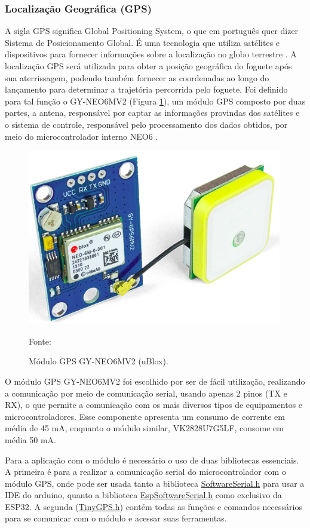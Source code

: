 \subsubsection{Localização Geográfica (GPS)}

A sigla GPS significa Global Positioning System, o que em português quer dizer Sistema de Posicionamento Global. É uma tecnologia que utiliza satélites e dispositivos para fornecer informações sobre a localização no globo terrestre \cite{fisica_GPS_2020}.
A localização GPS será utilizada para obter a posição geográfica do foguete após sua aterrissagem, podendo também fornecer as coordenadas ao longo do lançamento para determinar a trajetória percorrida pelo foguete.
Foi definido para tal função o GY-NEO6MV2 (Figura \ref{fig:moduloGPS}), um módulo GPS composto por duas partes, a antena, responsável por captar as informações provindas dos satélites e o sistema de controle, responsável pelo processamento dos dados obtidos, por meio do microcontrolador interno NEO6 \cite{datasheet_GPS}.

\begin{figure}[H]
  \centering
  \includegraphics[scale=0.6]{figuras/moduloGPS.png}
  \caption{Módulo GPS GY-NEO6MV2 (uBlox). }
  {\footnotesize Fonte: \cite{figura_GPS}}
  \label{fig:moduloGPS}
\end{figure}

O módulo GPS GY-NEO6MV2 foi escolhido por ser de fácil utilização, realizando a comunicação por meio de comunicação serial, usando apenas 2 pinos (TX e RX), o que permite a comunicação com os mais diversos tipos de equipamentos e microcontroladores. Esse componente apresenta um consumo de corrente em média de 45 mA, enquanto o módulo similar, VK2828U7G5LF, consome em média 50 mA.

Para a aplicação com o módulo é necessário o uso de duas bibliotecas essenciais. A primeira é para a realizar a comunicação serial do microcontrolador com o módulo GPS, onde pode ser usada tanto a biblioteca \href{https://www.arduino.cc/en/Reference/softwareSerial}{SoftwareSerial.h} para usar a IDE do arduino, quanto a biblioteca \href{https://github.com/plerup/espsoftwareserial}{EspSoftwareSerial.h} como exclusivo da ESP32. A segunda (\href{https://github.com/mikalhart/TinyGPS}{TinyGPS.h}) contém todas as funções e comandos necessários para se comunicar com o módulo e acessar suas ferramentas.

